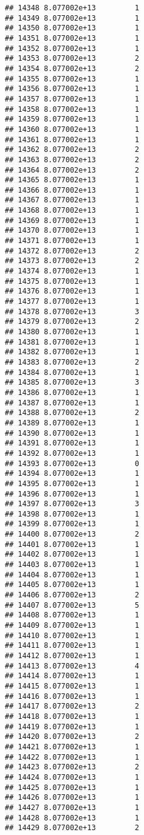 \documentclass[
]{article}
\begin{document}
\begin{verbatim}
## 14348 8.077002e+13         1
## 14349 8.077002e+13         1
## 14350 8.077002e+13         1
## 14351 8.077002e+13         1
## 14352 8.077002e+13         1
## 14353 8.077002e+13         2
## 14354 8.077002e+13         2
## 14355 8.077002e+13         1
## 14356 8.077002e+13         1
## 14357 8.077002e+13         1
## 14358 8.077002e+13         1
## 14359 8.077002e+13         1
## 14360 8.077002e+13         1
## 14361 8.077002e+13         1
## 14362 8.077002e+13         2
## 14363 8.077002e+13         2
## 14364 8.077002e+13         2
## 14365 8.077002e+13         1
## 14366 8.077002e+13         1
## 14367 8.077002e+13         1
## 14368 8.077002e+13         1
## 14369 8.077002e+13         1
## 14370 8.077002e+13         1
## 14371 8.077002e+13         1
## 14372 8.077002e+13         2
## 14373 8.077002e+13         2
## 14374 8.077002e+13         1
## 14375 8.077002e+13         1
## 14376 8.077002e+13         1
## 14377 8.077002e+13         1
## 14378 8.077002e+13         3
## 14379 8.077002e+13         2
## 14380 8.077002e+13         1
## 14381 8.077002e+13         1
## 14382 8.077002e+13         1
## 14383 8.077002e+13         2
## 14384 8.077002e+13         1
## 14385 8.077002e+13         3
## 14386 8.077002e+13         1
## 14387 8.077002e+13         1
## 14388 8.077002e+13         2
## 14389 8.077002e+13         1
## 14390 8.077002e+13         1
## 14391 8.077002e+13         1
## 14392 8.077002e+13         1
## 14393 8.077002e+13         0
## 14394 8.077002e+13         1
## 14395 8.077002e+13         1
## 14396 8.077002e+13         1
## 14397 8.077002e+13         3
## 14398 8.077002e+13         1
## 14399 8.077002e+13         1
## 14400 8.077002e+13         2
## 14401 8.077002e+13         1
## 14402 8.077002e+13         1
## 14403 8.077002e+13         1
## 14404 8.077002e+13         1
## 14405 8.077002e+13         1
## 14406 8.077002e+13         2
## 14407 8.077002e+13         5
## 14408 8.077002e+13         1
## 14409 8.077002e+13         1
## 14410 8.077002e+13         1
## 14411 8.077002e+13         1
## 14412 8.077002e+13         1
## 14413 8.077002e+13         4
## 14414 8.077002e+13         1
## 14415 8.077002e+13         1
## 14416 8.077002e+13         1
## 14417 8.077002e+13         2
## 14418 8.077002e+13         1
## 14419 8.077002e+13         1
## 14420 8.077002e+13         2
## 14421 8.077002e+13         1
## 14422 8.077002e+13         1
## 14423 8.077002e+13         2
## 14424 8.077002e+13         1
## 14425 8.077002e+13         1
## 14426 8.077002e+13         1
## 14427 8.077002e+13         1
## 14428 8.077002e+13         1
## 14429 8.077002e+13         2

\end{verbatim}
\end{document}
